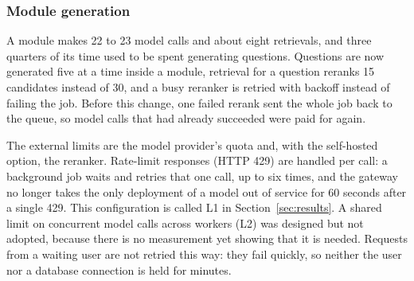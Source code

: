 \subsubsection{Module generation}
A module makes 22 to 23 model calls and about eight retrievals, and three quarters of its time used to be spent generating questions. Questions are now generated five at a time inside a module, retrieval for a question reranks 15 candidates instead of 30, and a busy reranker is retried with backoff instead of failing the job. Before this change, one failed rerank sent the whole job back to the queue, so model calls that had already succeeded were paid for again.

The external limits are the model provider's quota and, with the self-hosted option, the reranker. Rate-limit responses (HTTP 429) are handled per call: a background job waits and retries that one call, up to six times, and the gateway no longer takes the only deployment of a model out of service for 60 seconds after a single 429. This configuration is called L1 in Section~\ref{sec:results}. A shared limit on concurrent model calls across workers (L2) was designed but not adopted, because there is no measurement yet showing that it is needed. Requests from a waiting user are not retried this way: they fail quickly, so neither the user nor a database connection is held for minutes.
